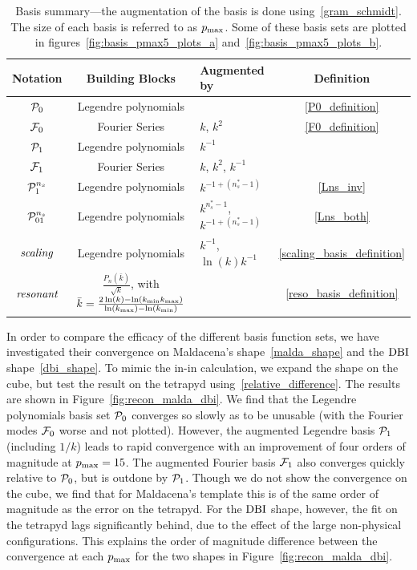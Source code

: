 \begin{table}[h!]
  \begin{center}
    \begin{tabular}{c|c|l|c}
      \textbf{Notation} & \textbf{Building Blocks} & \textbf{Augmented by} & \textbf{Definition}\\
      \hline
        $\mathcal{P}_0$  & Legendre polynomials &                & \eqref{P0_definition}\\
        $\mathcal{F}_0$  & Fourier Series & $k$, $k^2$           & \eqref{F0_definition}\\
        $\mathcal{P}_1$   & Legendre polynomials & $k^{-1}$       & \\
        $\mathcal{F}_1$   & Fourier Series & $k$, $k^2$, $k^{-1}$ & \\
        $\mathcal{P}^{n_s}_1$  & Legendre polynomials & $k^{-1+(n_s^{*}-1)}$   & \eqref{Lns_inv}\\
        $\mathcal{P}^{n_s}_{01}$ & Legendre polynomials& $k^{n_s^{*}-1}$, $k^{-1+(n_s^{*}-1)}$ & \eqref{Lns_both}\\
        $\textit{scaling}$ & Legendre polynomials& $k^{-1}$, $\ln(k)k^{-1}$ & \eqref{scaling_basis_definition}\\
        $\textit{resonant}$ & $\frac{P_n(\bar{k})}{\sqrt{k}}$, with $\bar{k}=\frac{2\ln(k)-\ln({k_\text{min}}{k_\text{max}})}{\ln({k_\text{max}})-\ln({k_\text{min}})}$& & \eqref{reso_basis_definition}\\
    \end{tabular}
    \caption{
          Basis summary---the augmentation of the basis is done
          using~\eqref{gram_schmidt}. The size of each basis is
          referred to as $p_\text{max}$. Some of these basis sets are
          plotted in figures~\ref{fig:basis_pmax5_plots_a}
          and~\ref{fig:basis_pmax5_plots_b}.
      }\label{tab:basis_summary}
  \end{center}
\end{table}

In order to compare the efficacy of the different basis function sets,
we have investigated their convergence on Maldacena's shape~\eqref{malda_shape} and the $\text{DBI}$ shape~\eqref{dbi_shape}.
To mimic the in-in calculation, we expand the shape on the cube, but test the result on the tetrapyd
using~\eqref{relative_difference}.
The results are shown in Figure~\ref{fig:recon_malda_dbi}.
We find that the Legendre polynomials basis set $\mathcal{P}_0$ converges so slowly as to be unusable
(with the Fourier modes $\mathcal{F}_0$ worse and not plotted).
However, the augmented Legendre basis $\mathcal{P}_1$ (including $1/k$) leads to rapid convergence with an improvement of four orders
of magnitude at $p_\text{max}=15$. The augmented Fourier basis $\mathcal{F}_1$ also converges
quickly relative to $\mathcal{P}_0$, but is outdone by $\mathcal{P}_1$.
Though we do not show the convergence on the cube, we find that for Maldacena's
template this is of the same order of magnitude as
the error on the tetrapyd.  For the $\text{DBI}$ shape, however, the
fit on the tetrapyd lags significantly behind, due to the effect
of the large non-physical configurations. This explains the order of
magnitude difference between the convergence at
each $p_\text{max}$ for the two shapes in Figure~\ref{fig:recon_malda_dbi}.


